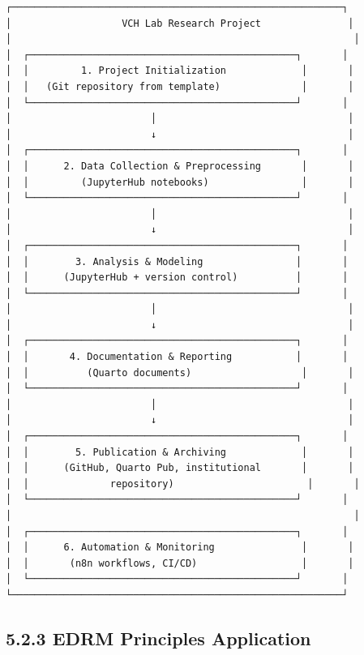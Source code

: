 \documentclass[
  oneside,
  open=any]{scrbook}
\begin{document}
\begin{verbatim}
┌─────────────────────────────────────────────────────────┐
│                   VCH Lab Research Project               │
│                                                           │
│  ┌──────────────────────────────────────────────┐       │
│  │         1. Project Initialization             │       │
│  │   (Git repository from template)              │       │
│  └──────────────────────────────────────────────┘       │
│                        │                                 │
│                        ↓                                 │
│  ┌──────────────────────────────────────────────┐       │
│  │      2. Data Collection & Preprocessing       │       │
│  │         (JupyterHub notebooks)                │       │
│  └──────────────────────────────────────────────┘       │
│                        │                                 │
│                        ↓                                 │
│  ┌──────────────────────────────────────────────┐       │
│  │        3. Analysis & Modeling                │       │
│  │      (JupyterHub + version control)          │       │
│  └──────────────────────────────────────────────┘       │
│                        │                                 │
│                        ↓                                 │
│  ┌──────────────────────────────────────────────┐       │
│  │       4. Documentation & Reporting           │       │
│  │          (Quarto documents)                   │       │
│  └──────────────────────────────────────────────┘       │
│                        │                                 │
│                        ↓                                 │
│  ┌──────────────────────────────────────────────┐       │
│  │        5. Publication & Archiving             │       │
│  │      (GitHub, Quarto Pub, institutional       │       │
│  │              repository)                       │       │
│  └──────────────────────────────────────────────┘       │
│                                                           │
│  ┌──────────────────────────────────────────────┐       │
│  │      6. Automation & Monitoring               │       │
│  │       (n8n workflows, CI/CD)                  │       │
│  └──────────────────────────────────────────────┘       │
└─────────────────────────────────────────────────────────┘
\end{verbatim}

\subsection{5.2.3 EDRM Principles
Application}\label{edrm-principles-application}
\end{document}

